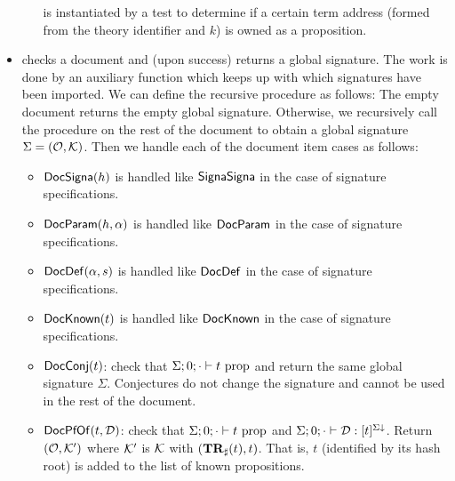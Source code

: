 \begin{itemize}
\begin{itemize}
is instantiated by a test to determine if a certain term address (formed from the theory identifier
and $k$) is owned as a proposition.
\end{itemize}
\item {} checks a document
and (upon success) returns a global signature.
The work is done by an auxiliary function {}
which keeps up with which signatures have been imported.
We can define the recursive procedure as follows:
The empty document returns the empty global signature.
Otherwise, we recursively call the procedure on the rest of the document
to obtain a global signature $\Sigma = (\mathcal{O},\mathcal{K})$.
Then we handle each of the document item cases as follows:
\begin{itemize}
\item $\mbox{\constr{DocSigna}}(h)$ is handled like ${\mbox{\constr{SignaSigna}}}$ in the case of signature specifications.
\item $\mbox{\constr{DocParam}}(h,\alpha)$ is handled like ${\mbox{\constr{DocParam}}}$ in the case of signature specifications.
\item $\mbox{\constr{DocDef}}(\alpha,s)$ is handled like ${\mbox{\constr{DocDef}}}$ in the case of signature specifications.
\item $\mbox{\constr{DocKnown}}(t)$ is handled like ${\mbox{\constr{DocKnown}}}$ in the case of signature specifications.
\item $\mbox{\constr{DocConj}}(t)$: check that $\Sigma;0;\cdot\vdash t ~\mbox{prop}$
and return the same global signature $\Sigma$.
Conjectures do not change the signature and cannot be used in the rest of the document.
\item $\mbox{\constr{DocPfOf}}(t,\cD)$: check that $\Sigma;0;\cdot\vdash t ~\mbox{prop}$
and $\Sigma;0;\cdot\vdash \mathcal{D} : [t]^{\Sigma\downarrow}$.
Return $(\mathcal{O},\mathcal{K}')$ where $\mathcal{K}'$ is $\mathcal{K}$ with $(\mathbf{TR}_{\sharp}(t),t)$. That is, $t$ (identified by its hash root)
is added to the list of known propositions.
\end{itemize}
\end{itemize}

